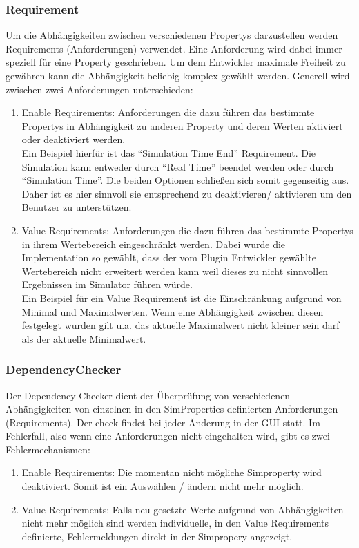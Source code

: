 \documentclass[a4paper, 11pt]{article} %
\begin{document}
\subsubsection{Requirement} %
\label{ssub:requirement}
Um die Abhängigkeiten zwischen verschiedenen Propertys darzustellen werden Requirements (Anforderungen) verwendet. Eine Anforderung wird dabei immer speziell für eine Property geschrieben. Um dem Entwickler maximale Freiheit zu gewähren kann die Abhängigkeit beliebig komplex gewählt werden.
Generell wird zwischen zwei Anforderungen unterschieden:
\begin{enumerate}
	\item Enable Requirements: Anforderungen die dazu führen das bestimmte Propertys in Abhängigkeit zu anderen Property und deren Werten aktiviert oder deaktiviert werden.
	\\Ein Beispiel hierfür ist das "`Simulation Time End"' Requirement. Die Simulation kann entweder durch "`Real Time"' beendet werden oder durch "`Simulation Time"'. Die beiden Optionen schließen sich somit gegenseitig aus. Daher ist es hier sinnvoll sie entsprechend zu deaktivieren/ aktivieren um den Benutzer zu unterstützen.
	\item Value Requirements: Anforderungen die dazu führen das bestimmte Propertys in ihrem Wertebereich eingeschränkt werden. Dabei wurde die Implementation so gewählt, dass der vom Plugin Entwickler gewählte Wertebereich nicht erweitert werden kann weil dieses zu nicht sinnvollen Ergebnissen im Simulator führen würde.
	\\ Ein Beispiel für ein Value Requirement ist die Einschränkung aufgrund von Minimal und Maximalwerten. Wenn eine Abhängigkeit zwischen diesen festgelegt wurden gilt u.a. das aktuelle Maximalwert nicht kleiner sein darf als der aktuelle Minimalwert.
\end{enumerate}


\subsubsection{DependencyChecker}
\label{sssub:dependencychecker}
Der Dependency Checker dient der Überprüfung von verschiedenen Abhängigkeiten von einzelnen in den SimProperties definierten Anforderungen (Requirements).
Der check findet bei jeder Änderung in der GUI statt. Im Fehlerfall, also wenn eine Anforderungen nicht eingehalten wird, gibt es zwei Fehlermechanismen:
\begin{enumerate}
	\item Enable Requirements: Die momentan nicht mögliche Simproperty wird deaktiviert. Somit ist ein Auswählen / ändern nicht mehr möglich.
	\item Value Requirements: Falls neu gesetzte Werte aufgrund von Abhängigkeiten nicht mehr möglich sind werden individuelle, in den Value Requirements definierte, Fehlermeldungen direkt in der Simpropery angezeigt.
\end{enumerate}
\end{document}
